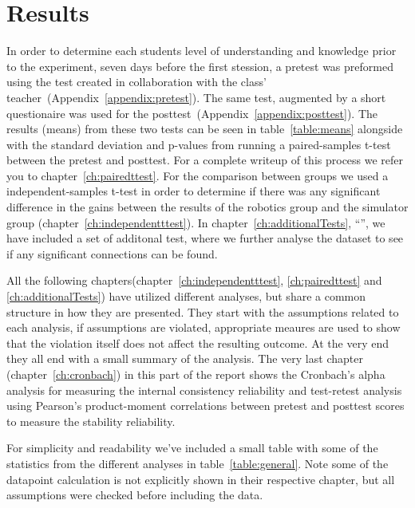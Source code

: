 \chapter{Results}
In order to determine each students level of understanding and knowledge prior to the experiment, seven days before the first stession, a pretest was preformed using the test created in collaboration with the class' teacher~(Appendix~\ref{appendix:pretest}). 
The same test, augmented by a short questionaire was used for the posttest~(Appendix~\ref{appendix:posttest}). The results (means) from these two tests can be seen in table~\ref{table:means} alongside with the standard deviation and p-values from running a paired-samples t-test between the pretest and posttest. For a complete writeup of this process we refer you to chapter~\ref{ch:pairedttest}.
For the comparison between groups we used a independent-samples t-test in order to determine if there was any
significant difference in the gains between the results of the robotics group and the simulator group (chapter~\ref{ch:independentttest}).
In chapter~\ref{ch:additionalTests}, "`"', we have included a set of additonal test,
where we further analyse the dataset to see if any significant connections can be found. 

\bigskip\noindent
All the following chapters(chapter~\ref{ch:independentttest}, \ref{ch:pairedttest} and \ref{ch:additionalTests}) have utilized different analyses, but share a common structure in how they are presented.
They start with the assumptions related to each analysis, if assumptions are violated, appropriate meaures are used to show that the violation itself does not affect the resulting outcome.
At the very end they all end with a small summary of the analysis. 
The very last chapter (chapter~\ref{ch:cronbach}) in this part of the report shows the Cronbach's alpha analysis for measuring the internal consistency reliability and test-retest analysis using Pearson's product-moment correlations between pretest and posttest scores to measure the stability reliability.

\bigskip\noindent
For simplicity and readability we've included a small table with some of the statistics from the different analyses in table~\ref{table:general}. Note some of the datapoint calculation is not explicitly shown in their respective chapter, but all assumptions were checked before including the data.

